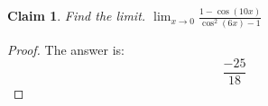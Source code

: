 \documentclass{article}
\newtheorem{theorem}{Claim}
\begin{document}
\begin{theorem}
Find the limit. $ \lim_{x \to 0} \frac{1-\cos\!\left(10x\right)}{\cos^{2}\!\left(6x\right)-1}$
\end{theorem}

\begin{proof}
The answer is:
\[
\frac{-25}{18}
\]
\end{proof}
\end{document}
